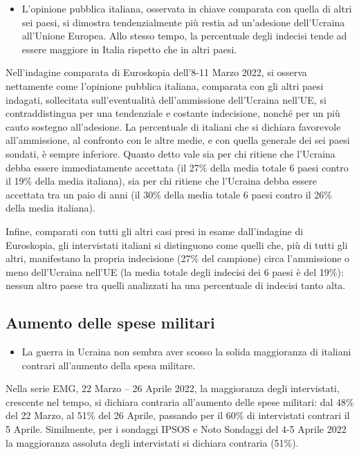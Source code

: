 \documentclass[
]{book}
\providecommand{\tightlist}{%
  \setlength{\itemsep}{0pt}\setlength{\parskip}{0pt}}
\begin{document}
\begin{itemize}
\tightlist
\item
  L'opinione pubblica italiana, osservata in chiave comparata con quella di altri sei paesi, si dimostra tendenzialmente più restia ad un'adesione dell'Ucraina all'Unione Europea. Allo stesso tempo, la percentuale degli indecisi tende ad essere maggiore in Italia rispetto che in altri paesi.
\end{itemize}

Nell'indagine comparata di Euroskopia dell'8-11 Marzo 2022, si osserva nettamente come l'opinione pubblica italiana, comparata con gli altri paesi indagati, sollecitata sull'eventualità dell'ammissione dell'Ucraina nell'UE, si contraddistingua per una tendenziale e costante indecisione, nonché per un più cauto sostegno all'adesione. La percentuale di italiani che si dichiara favorevole all'ammissione, al confronto con le altre medie, e con quella generale dei sei paesi sondati, è sempre inferiore.
Quanto detto vale sia per chi ritiene che l'Ucraina debba essere immediatamente accettata (il 27\% della media totale 6 paesi contro il 19\% della media italiana), sia per chi ritiene che l'Ucraina debba essere accettata tra un paio di anni (il 30\% della media totale 6 paesi contro il 26\% della media italiana).

Infine, comparati con tutti gli altri casi presi in esame dall'indagine di Euroskopia, gli intervistati italiani si distinguono come quelli che, più di tutti gli altri, manifestano la propria indecisione (27\% del campione) circa l'ammissione o meno dell'Ucraina nell'UE (la media totale degli indecisi dei 6 paesi è del 19\%): nessun altro paese tra quelli analizzati ha una percentuale di indecisi tanto alta.

\hypertarget{aumento-delle-spese-militari}{%
\subsection{Aumento delle spese militari}\label{aumento-delle-spese-militari}}

\begin{itemize}
\tightlist
\item
  La guerra in Ucraina non sembra aver scosso la solida maggioranza di italiani contrari all'aumento della spesa militare.
\end{itemize}

Nella serie EMG, 22 Marzo -- 26 Aprile 2022, la maggioranza degli intervistati, crescente nel tempo, si dichiara contraria all'aumento delle spese militari: dal 48\% del 22 Marzo, al 51\% del 26 Aprile, passando per il 60\% di intervistati contrari il 5 Aprile. Similmente, per i sondaggi IPSOS e Noto Sondaggi del 4-5 Aprile 2022 la maggioranza assoluta degli intervistati si dichiara contraria (51\%).
\end{document}

